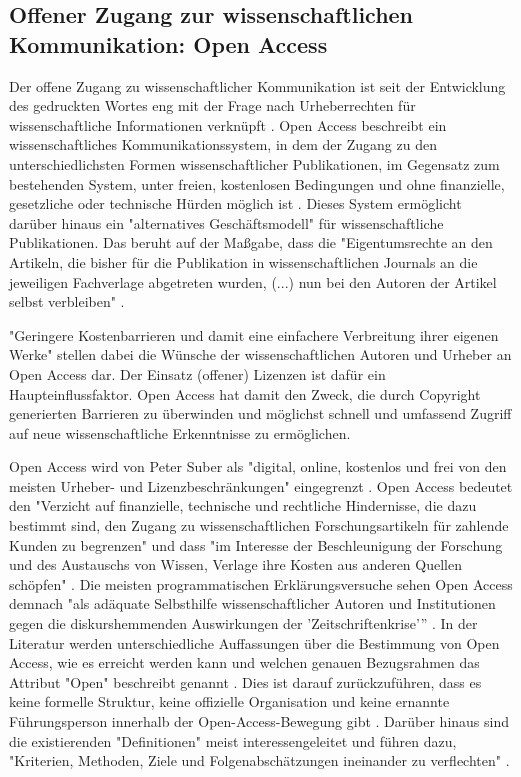 \subsection{Offener Zugang zur wissenschaftlichen Kommunikation: Open Access}

Der offene Zugang zu wissenschaftlicher Kommunikation ist seit der Entwicklung des gedruckten Wortes eng mit der Frage nach Urheberrechten für wissenschaftliche Informationen verknüpft \cite{Case_2000}. Open Access beschreibt ein wissenschaftliches Kommunikationssystem, in dem der Zugang zu den unterschiedlichsten Formen wissenschaftlicher Publikationen, im Gegensatz zum bestehenden System, unter freien, kostenlosen Bedingungen und ohne finanzielle, gesetzliche oder technische Hürden möglich ist \cite{Cloes_2009}. Dieses System ermöglicht darüber hinaus ein "alternatives Geschäftsmodell"\cite{Lewis_2012} für wissenschaftliche Publikationen. Das beruht auf der Maßgabe, dass die "Eigentumsrechte an den Artikeln, die bisher für die Publikation in wissenschaftlichen Journals an die jeweiligen Fachverlage abgetreten wurden, (...) nun bei den Autoren der Artikel selbst verbleiben" \cite{Hess_2006}.

"Geringere Kostenbarrieren und damit eine einfachere Verbreitung ihrer eigenen Werke" \cite{Cloes_2009} stellen dabei die Wünsche der wissenschaftlichen Autoren und Urheber an Open Access dar. Der Einsatz (offener) Lizenzen ist dafür ein Haupteinflussfaktor. Open Access hat damit den Zweck, die durch Copyright generierten Barrieren zu überwinden und möglichst schnell und umfassend Zugriff auf neue wissenschaftliche Erkenntnisse zu ermöglichen.

Open Access wird von Peter Suber als "digital, online, kostenlos und frei von den meisten Urheber- und Lizenzbeschränkungen" \cite[:4]{Suber_2012} eingegrenzt \cite{Adema_2014}. Open Access bedeutet den "Verzicht auf finanzielle, technische und rechtliche Hindernisse, die dazu bestimmt sind, den Zugang zu wissenschaftlichen Forschungsartikeln für zahlende Kunden zu begrenzen" und dass "im Interesse der Beschleunigung der Forschung und des Austauschs von Wissen, Verlage ihre Kosten aus anderen Quellen schöpfen" \cite{Suber_2002}. Die meisten programmatischen Erklärungsversuche sehen Open Access demnach "als adäquate Selbsthilfe wissenschaftlicher Autoren und Institutionen gegen die diskurshemmenden Auswirkungen der 'Zeitschriftenkrise'” \cite[:105]{Naeder_2010}. In der Literatur werden unterschiedliche Auffassungen über die Bestimmung von Open Access, wie es erreicht werden kann und welchen genauen Bezugsrahmen das Attribut "Open" beschreibt genannt \cite{Adema_2014} \cite{Herb_2012a}. Dies ist darauf zurückzuführen, dass es keine formelle Struktur, keine offizielle Organisation und keine ernannte Führungsperson innerhalb der Open-Access-Bewegung gibt \cite{Poynder_2011}. Darüber hinaus sind die existierenden "Definitionen" meist interessengeleitet und führen dazu, "Kriterien, Methoden, Ziele und Folgenabschätzungen ineinander zu verflechten" \cite[:105]{Naeder_2010}.

